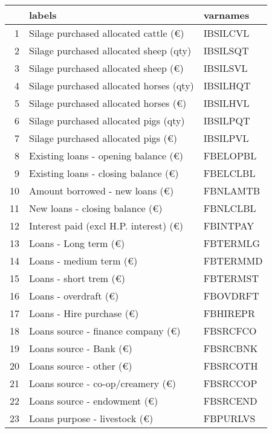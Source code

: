 \documentclass{article}\usepackage{graphicx, color}
\begin{document}
\begin{flushleft}
\newpage
\begin{table}[ht]
\begin{center}
\begin{tabular}{rll}
  \hline
 & labels & varnames \\ 
  \hline
1 & Silage purchased allocated cattle (€) & IBSILCVL \\ 
  2 & Silage purchased allocated sheep  (qty) & IBSILSQT \\ 
  3 & Silage purchased allocated sheep  (€) & IBSILSVL \\ 
  4 & Silage purchased allocated horses (qty) & IBSILHQT \\ 
  5 & Silage purchased allocated horses (€) & IBSILHVL \\ 
  6 & Silage purchased allocated pigs   (qty) & IBSILPQT \\ 
  7 & Silage purchased allocated pigs   (€) & IBSILPVL \\ 
  8 & Existing loans - opening balance (€) & FBELOPBL \\ 
  9 & Existing loans - closing balance (€) & FBELCLBL \\ 
  10 & Amount borrowed - new loans      (€) & FBNLAMTB \\ 
  11 & New loans - closing balance      (€) & FBNLCLBL \\ 
  12 & Interest paid (excl H.P. interest) (€) & FBINTPAY \\ 
  13 & Loans - Long term             (€) & FBTERMLG \\ 
  14 & Loans - medium term           (€) & FBTERMMD \\ 
  15 & Loans - short trem            (€) & FBTERMST \\ 
  16 & Loans - overdraft             (€) & FBOVDRFT \\ 
  17 & Loans - Hire purchase         (€) & FBHIREPR \\ 
  18 & Loans source - finance company (€) & FBSRCFCO \\ 
  19 & Loans source - Bank           (€) & FBSRCBNK \\ 
  20 & Loans source - other          (€) & FBSRCOTH \\ 
  21 & Loans source - co-op/creamery (€) & FBSRCCOP \\ 
  22 & Loans source - endowment      (€) & FBSRCEND \\ 
  23 & Loans purpose - livestock     (€) & FBPURLVS \\ 

\end{tabular}
\end{center}
\end{table}
\end{flushleft}
\end{document}
